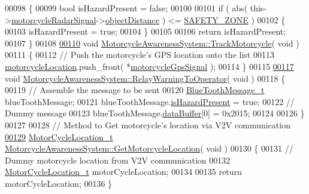 \begin{DoxyCode}
00098 \{
00099     \textcolor{keywordtype}{bool} isHazardPresent = \textcolor{keyword}{false};
00100 
00101     \textcolor{keywordflow}{if} ( abs( this->\hyperlink{classMotorcycleAwarenessSystem_a0744e71b9f440a86f5078c876ba7629b}{motorcycleRadarSignal}->\hyperlink{structRadarSignal__t_a96938fbfb77f208743a36d3f8b37cccb}{objectDistance} ) <= 
      \hyperlink{classMotorcycleAwarenessSystem_a131c99d85b78020f94fe14bd397f3a6e}{SAFETY\_ZONE} )
00102     \{
00103         isHazardPresent = \textcolor{keyword}{true};
00104     \}
00105 
00106     \textcolor{keywordflow}{return} isHazardPresent;
00107 \}
00108 
\hypertarget{MotorcycleAwarenessSystem_8cpp_source_l00110}{}\hyperlink{classMotorcycleAwarenessSystem_a4e6eec23ec46e24ee377a3c94e15eba4}{00110} \textcolor{keywordtype}{void} \hyperlink{classMotorcycleAwarenessSystem_a4e6eec23ec46e24ee377a3c94e15eba4}{MotorcycleAwarenessSystem::TrackMotorcycle}( \textcolor{keywordtype}{void} )
00111 \{
00112     \textcolor{comment}{// Push the motorcycle's GPS location onto the list}
00113     \hyperlink{classMotorcycleAwarenessSystem_af6becfeb1d11b467cb80a94a8e6940ac}{motorcycleLocation}.push\_front( *\hyperlink{classMotorcycleAwarenessSystem_ab281a3993b574923b2f379ed0477b2d4}{motorcycleGpsSignal} );
00114 \}
00115 
\hypertarget{MotorcycleAwarenessSystem_8cpp_source_l00117}{}\hyperlink{classMotorcycleAwarenessSystem_aec5e4731c6bf0789821ba2793918e3ee}{00117} \textcolor{keywordtype}{void} \hyperlink{classMotorcycleAwarenessSystem_aec5e4731c6bf0789821ba2793918e3ee}{MotorcycleAwarenessSystem::RelayWarningToOperator}( \textcolor{keywordtype}{
      void} )
00118 \{
00119     \textcolor{comment}{// Assemble the message to be sent}
00120     \hyperlink{structBlueToothMessage__t}{BlueToothMessage\_t} blueToothMessage;
00121     blueToothMessage.\hyperlink{structBlueToothMessage__t_a2dd315aa1cba1d2d3045e26b9f171e61}{isHazardPresent} = \textcolor{keyword}{true};
00122     \textcolor{comment}{// Dummy message}
00123     blueToothMessage.\hyperlink{structBlueToothMessage__t_ab872789a32f068dae8bcf77122256b78}{dataBuffer}[0] = 0x2015;
00124 
00126 \}
00127 
00128 \textcolor{comment}{// Method to Get motorcycle's location via V2V communication}
\hypertarget{MotorcycleAwarenessSystem_8cpp_source_l00129}{}\hyperlink{classMotorcycleAwarenessSystem_a840a5bc17d75276ecdb3a39d7aaf4109}{00129} \hyperlink{structMotorCycleLocation__t}{MotorCycleLocation\_t} 
      \hyperlink{classMotorcycleAwarenessSystem_a840a5bc17d75276ecdb3a39d7aaf4109}{MotorcycleAwarenessSystem::GetMotorcycleLocation}( \textcolor{keywordtype}{void} )
00130 \{
00131     \textcolor{comment}{// Dummy motorcycle location from V2V communication}
00132     \hyperlink{structMotorCycleLocation__t}{MotorCycleLocation\_t} motorCycleLocation;
00134 
00135     \textcolor{keywordflow}{return} motorCycleLocation;
00136 \}
\end{DoxyCode}
